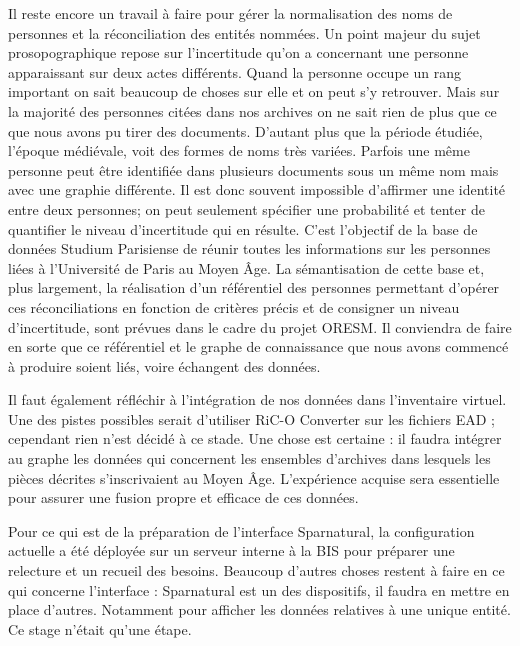 \par
Il reste encore un travail à faire pour gérer la normalisation des noms de personnes et la réconciliation des entités nommées. Un point majeur du sujet prosopographique repose sur l'incertitude qu'on a concernant une personne apparaissant sur deux actes différents. Quand la personne occupe un rang important on sait beaucoup de choses sur elle et on peut s'y retrouver. Mais sur la majorité des personnes citées dans nos archives on ne sait rien de plus que ce que nous avons pu tirer des documents. D'autant plus que la période étudiée, l'époque médiévale, voit des formes de noms très variées. Parfois une même personne peut être identifiée dans plusieurs documents sous un même nom mais avec une graphie différente. Il est donc souvent impossible d'affirmer une identité entre deux personnes; on peut seulement spécifier une probabilité et tenter de quantifier le niveau d'incertitude qui en résulte. C'est l'objectif de la base de données Studium Parisiense de réunir toutes les informations sur les personnes liées à l'Université de Paris au Moyen Âge. La sémantisation de cette base et, plus largement, la réalisation d'un référentiel des personnes permettant d'opérer ces réconciliations en fonction de critères précis et de consigner un niveau d'incertitude, sont prévues dans le cadre du projet ORESM. Il conviendra de faire en sorte que ce référentiel et le graphe de connaissance que nous avons commencé à produire soient liés, voire échangent des données.
 
\par
Il faut également réfléchir à l'intégration de nos données dans l'inventaire virtuel. Une des pistes possibles serait d'utiliser RiC-O Converter sur les fichiers EAD ; cependant rien n'est décidé à ce stade. Une chose est certaine : il faudra intégrer au graphe les données qui concernent les ensembles d'archives dans lesquels les pièces décrites s'inscrivaient au Moyen Âge. L'expérience acquise sera essentielle pour assurer une fusion propre et efficace de ces données.
\par
Pour ce qui est de la préparation de l'interface Sparnatural, la configuration actuelle a été déployée sur un serveur interne à la BIS pour préparer une relecture et un recueil des besoins. Beaucoup d'autres choses restent à faire en ce qui concerne l'interface : Sparnatural est un des dispositifs, il faudra en mettre en place d'autres. Notamment pour afficher les données relatives à une unique entité. Ce stage n'était qu'une étape.